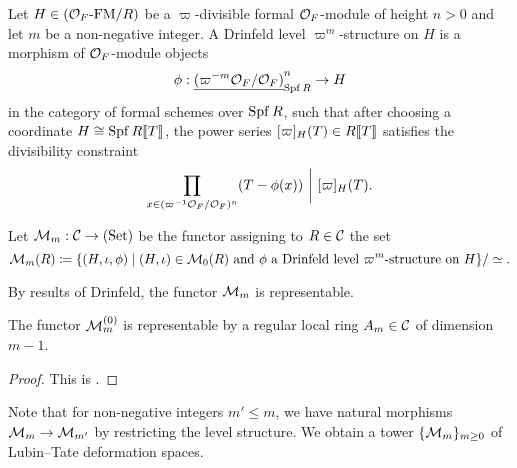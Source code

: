 \documentclass[../main.tex]{subfiles}
\begin{document}
\begin{defi}
  Let $H \in {({\mathcal{O}_F}\text-\allowbreak\mathrm{FM}/{R})}$ be a $\varpi$-divisible formal $\mathcal{O}_F$-module
  of height $n>0$ and let $m$ be a non-negative 
  integer. A Drinfeld level $\varpi^m$-structure on $H$ is a morphism of
  $\mathcal{O}_F$-module objects 
  \begin{equation*}
    \phi: \underline{(\varpi^{-m}\mathcal{O}_F/\mathcal{O}_F)}_{\operatorname{Spf} R}^n \to H
  \end{equation*}
  in the category of formal schemes over $\operatorname{Spf} R$,
  such that after choosing a coordinate $H \cong \operatorname{Spf} R\llbracket T \rrbracket$, the 
  power series $[\varpi]_H(T) \in R\llbracket T \rrbracket$ satisfies the divisibility constraint
  \begin{equation*}
    \prod_{x \in (\varpi^{-1}\mathcal{O}_F/\mathcal{O}_F)^n}(T - \phi(x)) \ \bigg\vert \ [\varpi]_H(T).
  \end{equation*}
\end{defi}

\begin{defi}\label{def:LTDefSpaceWithLevel}
  Let $\mathcal{M}_m: \mathcal{C} \to {(\mathrm{Set})}$ be the functor assigning to $R \in \mathcal{C}$ the set 
  \begin{equation*}
    \mathcal{M}_m(R) \coloneqq \{(H, \iota, \phi) \mid (H, \iota) \in \mathcal{M}_0(R) \text{ and }\phi
    \text{ a Drinfeld level $\varpi^m$-structure on $H$}\}/\simeq.
  \end{equation*}
\end{defi}

By results of Drinfeld, the functor $\mathcal{M}_m$ is representable.

\begin{thm}\label{thm:LTSpaceWithLevelRep}
  The functor $\mathcal{M}_m^{(0)}$ is representable by a regular local ring $A_m \in \mathcal{C}$ of 
  dimension $m-1$.
\begin{proof}
  This is \cite[Proposition 4.3]{drinfel1974elliptic}.
\end{proof}
\end{thm}

Note that for non-negative integers $m' \leq m$, we have natural morphisms $\mathcal{M}_m
\to \mathcal{M}_{m'}$ by restricting the level structure. We obtain a tower
$\{\mathcal{M}_m\}_{m \geq 0}$ of Lubin--Tate deformation spaces.
\end{document}
